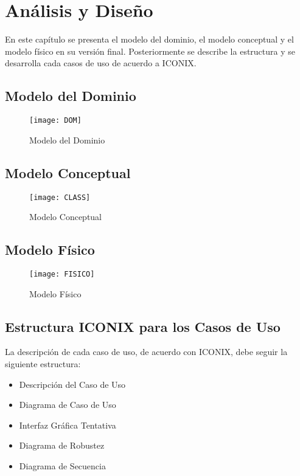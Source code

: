 \chapter{Análisis y Diseño}
En este capítulo se presenta el modelo del dominio, el modelo conceptual y el modelo físico en su versión final. Posteriormente se describe la estructura y se desarrolla cada casos de uso de acuerdo a ICONIX.
\begin{landscape}
\section{Modelo del Dominio}
    \begin{figure}[H]
        \centering
        \texttt{[image: DOM]}
        \caption{Modelo del Dominio}
        \label{fig:DOM}
    \end{figure}
\end{landscape}

\newpage 
\eject \pdfpagewidth=420mm \pdfpageheight=297mm
\section{Modelo Conceptual}
    \begin{figure}[H]
        \centering
        \texttt{[image: CLASS]}
        \caption{Modelo Conceptual}
        \label{fig:CLASS}
    \end{figure}

\newpage
\eject \pdfpagewidth=215.9mm \pdfpageheight=279.4mm
 
\section{Modelo Físico}
    \begin{figure}[H]
        \centering
        \texttt{[image: FISICO]}
        \caption{Modelo Físico}
        \label{fig:FISICO}
    \end{figure}


\section{Estructura ICONIX para los Casos de Uso}
La descripción de cada caso de uso, de acuerdo con ICONIX, debe seguir la siguiente estructura: 
\begin{itemize}
    \item Descripción del Caso de Uso
    \item Diagrama de Caso de Uso
    \item Interfaz Gráfica Tentativa
    \item Diagrama de Robustez
    \item Diagrama de Secuencia
\end{itemize}
